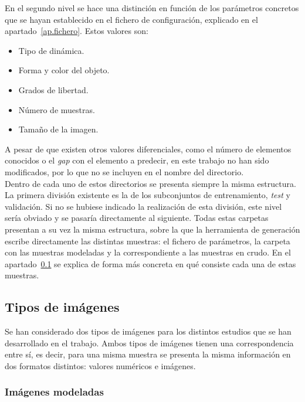 En el segundo nivel se hace una distinción en función de los parámetros concretos que se hayan establecido en el fichero de configuración, explicado en el apartado~\ref{ap.fichero}. Estos valores son:

\begin{itemize}
    \setlength\itemsep{3pt}
    \item Tipo de dinámica.
    \item Forma y color del objeto.
    \item Grados de libertad.
    \item Número de muestras.
    \item Tamaño de la imagen.
\end{itemize}

A pesar de que existen otros valores diferenciales, como el número de elementos conocidos o el \textit{gap} con el elemento a predecir, en este trabajo no han sido modificados, por lo que no se incluyen en el nombre del directorio.\\

Dentro de cada uno de estos directorios se presenta siempre la misma estructura. La primera división existente es la de los subconjuntos de entrenamiento, \textit{test} y validación. Si no se hubiese indicado la realización de esta división, este nivel sería obviado y se pasaría directamente al siguiente. Todas estas carpetas presentan a su vez la misma estructura, sobre la que la herramienta de generación escribe directamente las distintas muestras: el fichero de parámetros, la carpeta con las muestras modeladas y la correspondiente a las muestras en crudo. En el apartado~\ref{ap.tip_img} se explica de forma más concreta en qué consiste cada una de estas muestras.

\subsection{Tipos de imágenes} \label{ap.tip_img}

Se han considerado dos tipos de imágenes para los distintos estudios que se han desarrollado en el trabajo. Ambos tipos de imágenes tienen una correspondencia entre sí, es decir, para una misma muestra se presenta la misma información en dos formatos distintos: valores numéricos e imágenes.

\subsubsection{Imágenes modeladas}

